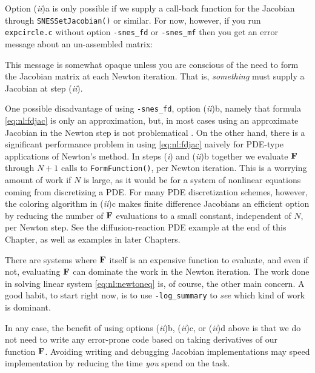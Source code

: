 Option (\emph{ii})a is only possible if we supply a call-back function for the Jacobian through \texttt{SNESSetJacobian()} or similar.  For now, however, if you run \texttt{expcircle.c} without option \texttt{-snes\_fd} or \texttt{-snes\_mf} then you get an error message about an un-assembled matrix:
This message is somewhat opaque unless you are conscious of the need to form the Jacobian matrix at each Newton iteration.  That is, \emph{something} must supply a Jacobian at step (\emph{ii}).

One possible disadvantage of using  \texttt{-snes\_fd}, option (\emph{ii})b, namely that formula \eqref{eq:nl:fdjac} is only an approximation, but, in most cases using an approximate Jacobian in the Newton step is not problematical \citep{Kelley2003}.  On the other hand, there is a significant performance problem in using \eqref{eq:nl:fdjac} naively for PDE-type applications of Newton's method.  In steps (\emph{i}) and (\emph{ii})b together we evaluate $\mathbf{F}$ through $N+1$ calls to \texttt{FormFunction()}, per Newton iteration.  This is a worrying amount of work if $N$ is large, as it would be for a system of nonlinear equations coming from discretizing a PDE.  For many PDE discretization schemes, however, the coloring algorithm in (\emph{ii})c makes finite difference Jacobians an efficient option by reducing the number of $\mathbf{F}$ evaluations to a small constant, independent of $N$, per Newton step.  See the diffusion-reaction PDE example at the end of this Chapter, as well as examples in later Chapters.

There are systems where $\mathbf{F}$ itself is an expensive function to evaluate, and even if not, evaluating $\mathbf{F}$ can dominate the work in the Newton iteration.  The work done in solving linear system \eqref{eq:nl:newtoneq} is, of course, the other main concern.  A good \PETSc habit, to start right now, is to use \texttt{-log\_summary} to \emph{see} which kind of work is dominant.

In any case, the benefit of using options (\emph{ii})b, (\emph{ii})c, or (\emph{ii})d above is that we do not need to write any error-prone code based on taking derivatives of our function $\mathbf{F}$.  Avoiding writing and debugging Jacobian implementations may speed implementation by reducing the time \emph{you} spend on the task.


